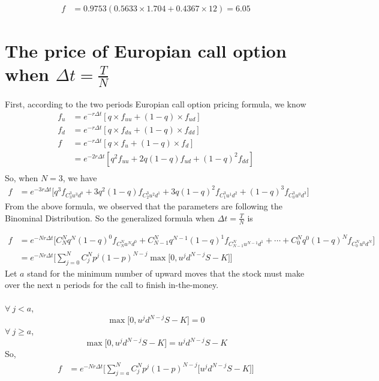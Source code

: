 \documentclass[12pt]{article}
\begin{document}
\begin{align*}
    f &= 0.9753(0.5633\times 1.704 + 0.4367 \times 12) = 6.05
\end{align*}

\newpage
\section{The price of Europian call option when $\Delta t = \frac{T}{N}$}
First, according to the two periods Europian call option pricing formula, we know
\begin{align*}
    f_u &= e^{-r\Delta t}[q\times f_{uu}+(1-q)\times f_{ud}]\\ 
    f_d &= e^{-r\Delta t}[q\times f_{du}+(1-q)\times f_{dd}]\\
    f &= e^{-r\Delta t}[q\times f_{u}+(1-q)\times f_{d}]\\
    &= e^{-2r\Delta t}[q^2f_{uu} + 2q(1-q)f_{ud} + (1-q)^2f_{dd}]\\
\end{align*}
So, when $N=3$, we have
\begin{align*}
    f &= e^{-3r\Delta t}\Big[q^3f_{C^3_3 u^3d^0} + 3q^2(1-q)f_{C^3_2 u^2d^1} + 3q(1-q)^2f_{C^3_1 u^1d^2} + (1-q)^3f_{C^3_0 u^0d^3}\Big] 
\end{align*}
From the above formula, we observed that the parameters are following the Binominal Distribution. So the generalized formula when $\Delta t = \frac{T}{N}$ is

\begin{align*}
    f &= e^{-Nr\Delta t}\Big[C_N^N q^N (1-q)^0 f_{C_N^N u^N d^0} + C_{N-1}^{N} q^{N-1} (1-q)^1 f_{C_{N-1}^{N} u^{N-1} d^1} + \cdots + C_0^N q^0 (1-q)^N f_{C_0^N u^0 d^N}\Big]\\
    &= e^{-Nr\Delta t}\Big[\sum_{j=0}^N C^N_j p^j (1-p)^{N-j}\max\big[0, u^j d^{N-j}S-K\big]\Big]
\end{align*}
Let $a$ stand for the minimum number of upward moves that the stock must make over the next n periods for the call to finish in-the-money.\\\\
$\forall\ j<a$,
\[
    \max\big[0, u^j d^{N-j}S-K\big] = 0
\]
$\forall\ j\ge a$,
\[
    \max\big[0, u^j d^{N-j}S-K\big] = u^j d^{N-j}S-K
\]
So,
\begin{align*}
    f &= e^{-Nr\Delta t} \Bigg[\sum_{j=a}^N C^N_j p^j (1-p)^{N-j} \big[u^j d^{N-j}S-K\big]\Bigg]
\end{align*}

\newpage
\end{document}
